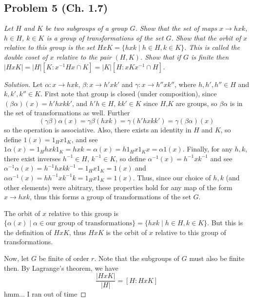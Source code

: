 \documentclass{article}
\begin{document}
\subsection*{Problem 5 (Ch. 1.7)}
{\it Let $H$ and $K$ be two subgroups of a group $G$.
Show that the set of maps $x \to hxk$, $h \in H$, $k \in K$
is a group of transformations of the set $G$.
Show that the orbit of $x$ relative to this group
is the set $HxK = \{hxk \mid h\in H, k\in K\}$.
This is called the \emph{double coset of $x$ relative to the pair $(H,K)$}.
Show that if $G$ is finite then $|HxK| = |H|[K \colon x^{-1}Hx\cap K]
= |K|[H\colon xKx^{-1} \cap H]$.}
\begin{proof}[Solution]\let\qed\relax
	Let $\alpha \colon x \to hxk$, $\beta \colon x \to h'xk'$
	and $\gamma \colon x \to h''xk''$,
	where $h,h',h'' \in H$ and $k,k',k'' \in K$.
	First note that group is closed (under composition),
	since $(\beta\alpha)(x) = h'hxkk'$,
	and $h'h \in H$, $kk' \in K$ since $H$,$K$ are groups,
	so $\beta\alpha$ is in the set of transformations as well.
	Further
	\[
		(\gamma\beta)\alpha(x) = \gamma\beta(hxk) = \gamma(h'hxkk')
		= \gamma (\beta\alpha)(x)
	\]
	so the operation is associative.
	Also, there exists an identity in $H$ and $K$,
	so define $1(x) = 1_Hx1_K$,
	and see $1\alpha(x) = 1_Hhxk1_K = hxk = \alpha(x) = h1_Hx1_Kx = \alpha1(x)$.
	Finally, for any $h,k$, there exist inverses $h^{-1} \in H$, $k^{-1} \in K$,
	so define $\alpha^{-1}(x) = h^{-1}xk^{-1}$
	and see $\alpha^{-1}\alpha(x) = h^{-1}hxkk^{-1} = 1_Hx1_K = 1(x)$
	and $\alpha\alpha^{-1}(x) = hh^{-1}xk^{-1}k = 1_Hx1_K = 1(x)$.
	Thus, since our choice of $h,k$ (and other elements) were abitrary,
	these properties hold for any map of the form $x \to hxk$,
	thus this forms a group of transformations of the set $G$.

	The orbit of $x$ relative to this group is
	$\{\alpha(x) \mid \alpha \in \text{our group of transformations}\}
	= \{hxk \mid h\in H, k \in K\}$.
	But this is the definition of $HxK$,
	thus $HxK$ is the orbit of $x$ relative to this group of transformations.

	Now, let $G$ be finite of order $r$.
	Note that the subgroups of $G$ must also be finite then.
	By Lagrange's theorem, we have
	\[
		\frac{|HxK|}{|H|} = [H : HxK]
	\]
	hmm... I ran out of time
\end{proof}
\end{document}
